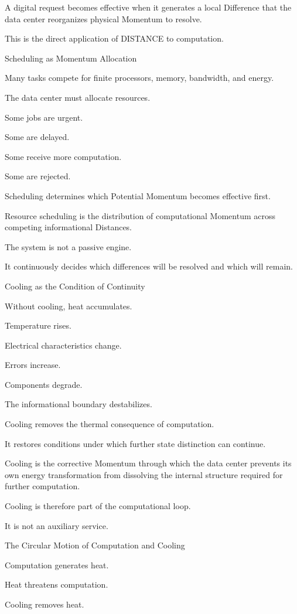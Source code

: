 A digital request becomes effective when it generates a local Difference that the data center reorganizes physical Momentum to resolve.

This is the direct application of DISTANCE to computation.

Scheduling as Momentum Allocation

Many tasks compete for finite processors, memory, bandwidth, and energy.

The data center must allocate resources.

Some jobs are urgent.

Some are delayed.

Some receive more computation.

Some are rejected.

Scheduling determines which Potential Momentum becomes effective first.

Resource scheduling is the distribution of computational Momentum across competing informational Distances.

The system is not a passive engine.

It continuously decides which differences will be resolved and which will remain.

Cooling as the Condition of Continuity

Without cooling, heat accumulates.

Temperature rises.

Electrical characteristics change.

Errors increase.

Components degrade.

The informational boundary destabilizes.

Cooling removes the thermal consequence of computation.

It restores conditions under which further state distinction can continue.

Cooling is the corrective Momentum through which the data center prevents its own energy transformation from dissolving the internal structure required for further computation.

Cooling is therefore part of the computational loop.

It is not an auxiliary service.

The Circular Motion of Computation and Cooling

Computation generates heat.

Heat threatens computation.

Cooling removes heat.

